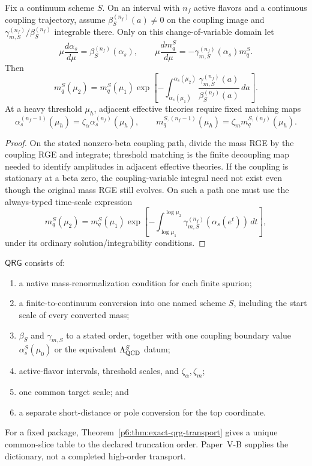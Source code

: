 \documentclass[12pt,a4paper]{article}
\begin{document}
\begin{theorem}
\label{p6:thm:exact-qrg-transport}
Fix a continuum scheme \(S\).  On an interval with \(n_f\) active flavors and a continuous coupling
trajectory, assume \(\beta_S^{(n_f)}(a)\neq0\) on the coupling
image and \(\gamma_{m,S}^{(n_f)}/\beta_S^{(n_f)}\) integrable there.
Only on this change-of-variable domain let
\[
\mu\frac{d\alpha_s}{d\mu}
=
\beta_S^{(n_f)}(\alpha_s),
\qquad
\mu\frac{dm_q^S}{d\mu}
=
-\gamma_{m,S}^{(n_f)}(\alpha_s)m_q^S .
\]
Then
\[
\boxed{
m_q^S(\mu_2)
=
m_q^S(\mu_1)
\exp\left[
-\int_{\alpha_s(\mu_1)}^{\alpha_s(\mu_2)}
\frac{\gamma_{m,S}^{(n_f)}(a)}
{\beta_S^{(n_f)}(a)}\,da
\right].
}
\]
At a heavy threshold \(\mu_h\), adjacent effective theories require fixed
matching maps
\[
\alpha_s^{(n_f-1)}(\mu_h)
=
\zeta_\alpha\alpha_s^{(n_f)}(\mu_h),
\qquad
m_q^{S,(n_f-1)}(\mu_h)
=
\zeta_m m_q^{S,(n_f)}(\mu_h).
\]
\end{theorem}

\begin{proof}
On the stated nonzero-beta coupling path, divide the mass RGE by the
coupling RGE and integrate; threshold matching is the finite decoupling
map needed to identify amplitudes in adjacent effective theories.
If the coupling is stationary at a beta zero, the coupling-variable integral
need not exist even though the original mass RGE still evolves. On such a
path one must use the always-typed time-scale expression
\[
 m_q^S(\mu_2)=m_q^S(\mu_1)
 \exp\left[-\int_{\log\mu_1}^{\log\mu_2}
 \gamma_{m,S}^{(n_f)}(\alpha_s(e^t))\,dt\right],
\]
under its ordinary solution/integrability conditions.
\end{proof}

\begin{definition}
\label{p6:def:qrg-package}
\(\mathsf{QRG}\) consists of:
\begin{enumerate}[label=(\roman*),leftmargin=2em]
\item a native mass-renormalization condition for each finite spurion;
\item a finite-to-continuum conversion into one named scheme \(S\), including
the start scale of every converted mass;
\item \(\beta_S\) and \(\gamma_{m,S}\) to a stated order, together with one
coupling boundary value \(\alpha_s^S(\mu_0)\) or the equivalent
\(\Lambda_{\rm QCD}^S\) datum;
\item active-flavor intervals, threshold scales, and
\(\zeta_\alpha,\zeta_m\);
\item one common target scale; and
\item a separate short-distance or pole conversion for the top coordinate.
\end{enumerate}
For a fixed package, Theorem~\ref{p6:thm:exact-qrg-transport} gives a unique
common-slice table to the declared truncation order.  Paper~V-B supplies the
dictionary, not a completed high-order transport.
\end{definition}
\end{document}
